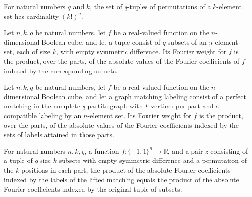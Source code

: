 \begin{theorem}
\label{FABL.card_parityTupleReordering}
\leanok
{}
For natural numbers $q$ and $k$, the set of $q$-tuples of permutations of a $k$-element
set has cardinality $(k!)^q$.
\end{theorem}

\begin{definition}
\label{FABL.parityTupleFourierWeight}
\leanok
{}
Let $n,k,q$ be natural numbers, let $f$ be a real-valued function on the $n$-dimensional
Boolean cube, and let a tuple consist of $q$ subsets of an $n$-element set, each of size
$k$, with empty symmetric difference. Its Fourier weight for $f$ is the product, over
the parts, of the absolute values of the Fourier coefficients of $f$ indexed by the
corresponding subsets.
\end{definition}

\begin{definition}
\label{FABL.matchingLabelingFourierWeight}
\leanok
{}
Let $n,k,q$ be natural numbers, let $f$ be a real-valued function on the $n$-dimensional
Boolean cube, and let a graph matching labeling consist of a perfect matching in the
complete $q$-partite graph with $k$ vertices per part and a compatible labeling by an
$n$-element set. Its Fourier weight for $f$ is the product, over the parts, of the
absolute values of the Fourier coefficients indexed by the sets of labels attained in
those parts.
\end{definition}

\begin{theorem}
\label{FABL.parityTupleMatchingLift_weight}
\leanok
{}
For natural numbers $n,k,q$, a function $f:\{-1,1\}^n\to\mathbb{R}$, and a pair $z$
consisting of a tuple of $q$ size-$k$ subsets with empty symmetric difference and a
permutation of the $k$ positions in each part, the product of the absolute Fourier
coefficients indexed by the labels of the lifted matching equals the product of the
absolute Fourier coefficients indexed by the original tuple of subsets.
\end{theorem}


